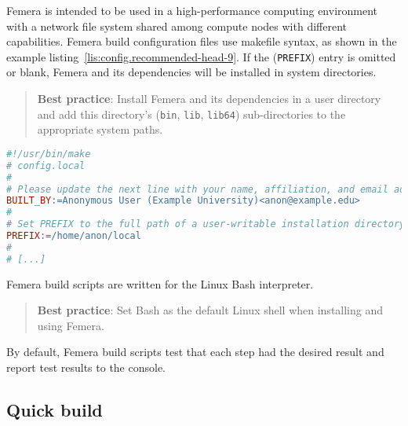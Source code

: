 Femera is intended to be used in a high-performance computing environment
with a network file system shared among compute nodes with different
capabilities.
Femera build configuration files use makefile syntax, as shown in
the example listing~\ref{lis:config.recommended-head-9}.
If the (\texttt{PREFIX}) entry is omitted or blank,
Femera and its dependencies will be installed in system directories.
\begin{verse}
\textbf{Best practice}:
Install Femera and its dependencies in a user directory and add this directory's
(\texttt{bin}, \texttt{lib}, \texttt{lib64})
sub-directories to the appropriate system paths.
\end{verse}
\begin{comment}
tdd:tests/post-install/femera\_is\_installed\_to\_local\_dir\_in\_path.py
\end{comment}

\begin{lstlisting}[caption={Excerpt of an example Femera configuration file
(\texttt{config.local})},
label={lis:config.recommended-head-9},language=make,float=ht]
#!/usr/bin/make
# config.local
#
# Please update the next line with your name, affiliation, and email address.
BUILT_BY:=Anonymous User (Example University)<anon@example.edu>
#
# Set PREFIX to the full path of a user-writable installation directory.
PREFIX:=/home/anon/local
#
# [...]
\end{lstlisting}

\begin{comment}
tdd:tests/pre-build/config\_recommended\_head\_n8\_is\_in\_guide.py
\end{comment}

Femera build scripts are written for the Linux Bash interpreter.
\begin{verse}
\textbf{Best practice}:
Set Bash as the default Linux shell when installing and using Femera.
\end{verse}

By default, Femera build scripts test that each step had the desired
result and report test results to the console.

\subsection{Quick build\label{subsec:Quick-build}}

